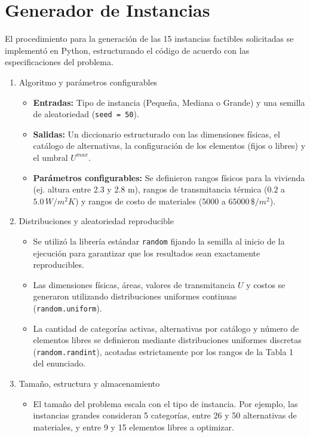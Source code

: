 \section{Generador de Instancias}
El procedimiento para la generación de las 15 instancias factibles solicitadas se implementó en Python, estructurando el código de acuerdo con las especificaciones del problema.
\newline
\newline
\begin{enumerate}
\item Algoritmo y parámetros configurables
\begin{itemize}
\item \textbf{Entradas:} Tipo de instancia (Pequeña, Mediana o Grande) y una semilla de aleatoriedad (\texttt{seed = 50}).
\item \textbf{Salidas:} Un diccionario estructurado con las dimensiones físicas, el catálogo de alternativas, la configuración de los elementos (fijos o libres) y el umbral $U^{max}$.
\item \textbf{Parámetros configurables:} Se definieron rangos físicos para la vivienda (ej. altura entre 2.3 y 2.8 m), rangos de transmitancia térmica ($0.2$ a $5.0 \, W/m^2K$) y rangos de costo de materiales ($5000$ a $65000 \, \$/m^2$).
\end{itemize}
\item Distribuciones y aleatoriedad reproducible
\begin{itemize}
\item Se utilizó la librería estándar \texttt{random} fijando la semilla al inicio de la ejecución para garantizar que los resultados sean exactamente reproducibles.
\item Las dimensiones físicas, áreas, valores de transmitancia $U$ y costos se generaron utilizando distribuciones uniformes continuas (\texttt{random.uniform}).
\item La cantidad de categorías activas, alternativas por catálogo y número de elementos libres se definieron mediante distribuciones uniformes discretas (\texttt{random.randint}), acotadas estrictamente por los rangos de la Tabla 1 del enunciado.
\end{itemize}
\item Tamaño, estructura y almacenamiento
\begin{itemize}
\item El tamaño del problema escala con el tipo de instancia. Por ejemplo, las instancias grandes consideran 5 categorías, entre 26 y 50 alternativas de materiales, y entre 9 y 15 elementos libres a optimizar.

\end{itemize}
\end{enumerate}
